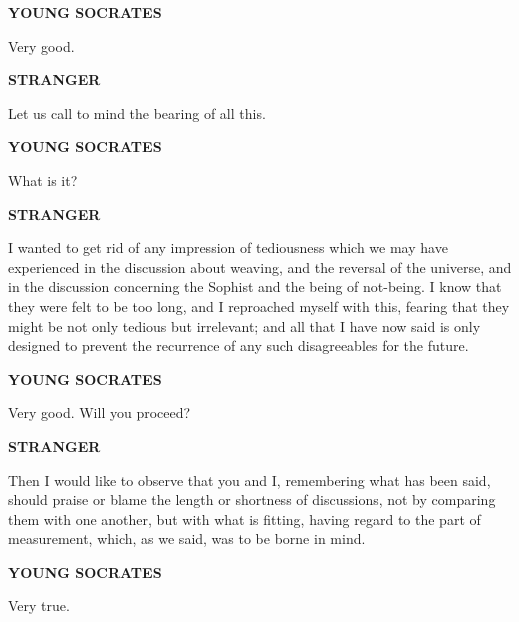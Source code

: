 \documentclass[11pt,letter]{article}
\begin{document}
\par \textbf{YOUNG SOCRATES}
\par   Very good.

\par \textbf{STRANGER}
\par   Let us call to mind the bearing of all this.

\par \textbf{YOUNG SOCRATES}
\par   What is it?

\par \textbf{STRANGER}
\par   I wanted to get rid of any impression of tediousness which we may have experienced in the discussion about weaving, and the reversal of the universe, and in the discussion concerning the Sophist and the being of not-being. I know that they were felt to be too long, and I reproached myself with this, fearing that they might be not only tedious but irrelevant; and all that I have now said is only designed to prevent the recurrence of any such disagreeables for the future.

\par \textbf{YOUNG SOCRATES}
\par   Very good. Will you proceed?

\par \textbf{STRANGER}
\par   Then I would like to observe that you and I, remembering what has been said, should praise or blame the length or shortness of discussions, not by comparing them with one another, but with what is fitting, having regard to the part of measurement, which, as we said, was to be borne in mind.

\par \textbf{YOUNG SOCRATES}
\par   Very true.
\end{document}
